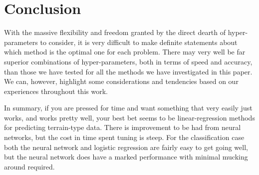 \documentclass[reprint, english, nofootinbib]{revtex4-2}
\begin{document}


\section{Conclusion}

\noindent
With the massive flexibility and freedom granted by the direct dearth of hyper-parameters to consider, it is very difficult to make definite statements about which method is the optimal one for each problem. There may very well be far superior combinations of hyper-parameters, both in terms of speed and accuracy, than those we have tested for all the methods we have investigated in this paper. We can, however, highlight some considerations and tendencies based on our experiences throughout this work.



In summary, if you are pressed for time and want something that very easily just works, and works pretty well, your best bet seems to be linear-regression methods for predicting terrain-type data. There is improvement to be had from neural networks, but the cost in time spent tuning is steep. For the classification case both the neural network and logistic regression are fairly easy to get going well, but the neural network does have a marked performance with minimal mucking around required.


\onecolumngrid

\twocolumngrid
\end{document}
